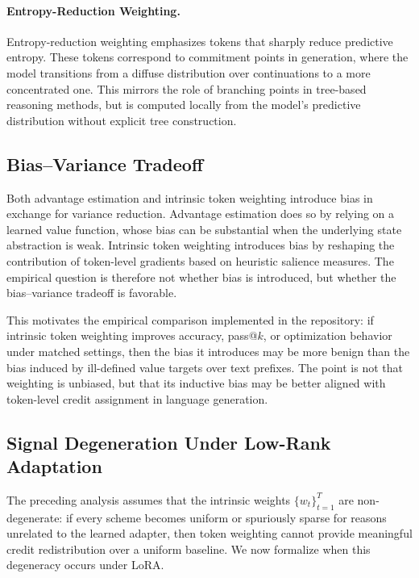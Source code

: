 \paragraph{Entropy-Reduction Weighting.}
Entropy-reduction weighting emphasizes tokens that sharply reduce predictive entropy.
These tokens correspond to commitment points in generation, where the model transitions
from a diffuse distribution over continuations to a more concentrated one. This mirrors
the role of branching points in tree-based reasoning methods, but is computed locally
from the model's predictive distribution without explicit tree construction.

\subsection{Bias--Variance Tradeoff}

Both advantage estimation and intrinsic token weighting introduce bias in exchange for
variance reduction. Advantage estimation does so by relying on a learned value function,
whose bias can be substantial when the underlying state abstraction is weak. Intrinsic
token weighting introduces bias by reshaping the contribution of token-level gradients
based on heuristic salience measures. The empirical question is therefore not whether
bias is introduced, but whether the bias--variance tradeoff is favorable.

This motivates the empirical comparison implemented in the repository: if intrinsic
token weighting improves accuracy, pass@$k$, or optimization behavior under matched
settings, then the bias it introduces may be more benign than the bias induced by
ill-defined value targets over text prefixes. The point is not that weighting is
unbiased, but that its inductive bias may be better aligned with token-level credit
assignment in language generation.

\subsection{Signal Degeneration Under Low-Rank Adaptation}\label{sec:theory-collapse}

The preceding analysis assumes that the intrinsic weights
$\{w_t\}_{t=1}^T$ are non-degenerate: if every scheme becomes uniform or
spuriously sparse for reasons unrelated to the learned adapter, then token
weighting cannot provide meaningful credit redistribution over a uniform
baseline. We now formalize when this degeneracy occurs under LoRA.

